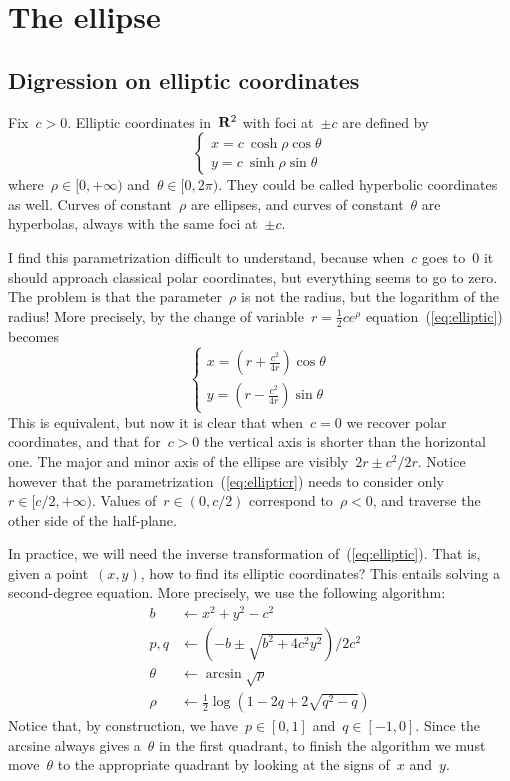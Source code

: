 \section{The ellipse}


\subsection{Digression on elliptic coordinates}

Fix~$c>0$.  Elliptic coordinates in~$\mathbf{R}^2$ with foci at~$\pm c$ are
defined by
\begin{equation}\label{eq:elliptic}
	\begin{cases}
		x = c\ \cosh\rho\cos\theta \\
		y = c\ \sinh\rho\sin\theta
	\end{cases}
\end{equation}
where~$\rho\in[0,+\infty)$ and~$\theta\in[0,2\pi)$.
They could be called hyperbolic coordinates as well.
Curves of constant~$\rho$ are ellipses, and curves of
constant~$\theta$ are hyperbolas, always with the same foci at~$\pm c$.

I find this parametrization difficult to understand,
because when~$c$ goes to~$0$ it should approach classical polar
coordinates, but everything seems to go to zero.
The problem is that the parameter~$\rho$ is not the radius, but the
logarithm of the radius!  More precisely, by the change of
variable~$r=\frac12ce^\rho$ equation~(\ref{eq:elliptic}) becomes
\begin{equation}\label{eq:ellipticr}
	\begin{cases}
		x = \left(r + \frac{c^2}{4r}\right)\cos\theta \\
		y = \left(r - \frac{c^2}{4r}\right)\sin\theta
	\end{cases}
\end{equation}
This is equivalent, but now it is clear that when~$c=0$ we recover
polar coordinates, and that for~$c>0$ the vertical axis is shorter
than the horizontal one.  The major and minor axis of the ellipse are
visibly~$2r\pm c^2/2r$.
Notice however that the
parametrization~(\ref{eq:ellipticr}) needs to consider
only~$r\in[c/2,+\infty)$.  Values of~$r\in(0,c/2)$ correspond
to~$\rho<0$, and traverse the other side of the half-plane.


In practice, we will need the inverse transformation
of~(\ref{eq:elliptic}).  That is, given a point~$(x,y)$, how to
find its elliptic coordinates?  This entails solving a second-degree
equation.  More precisely, we use the following algorithm:
\begin{align*}
	b   & \leftarrow x^2+y^2-c^2 \\
	p,q & \leftarrow \left(-b\pm\sqrt{b^2+4c^2y^2}\right)/{2c^2} \\
	\theta & \leftarrow \arcsin\sqrt{p} \\
	\rho & \leftarrow  \frac12\log\left(1-2q+2\sqrt{q^2-q}\right)
\end{align*}
Notice that, by construction, we have~$p\in[0,1]$ and~$q\in[-1,0]$.
Since the arcsine
always gives a~$\theta$ in the first quadrant, to finish the
algorithm we must move~$\theta$ to the appropriate quadrant by
looking at the signs of~$x$ and~$y$.


